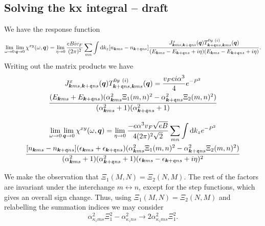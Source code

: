 \subsection{Solving the kx integral -- draft}
We have the response function
\[
  \lim_{\omega \to 0} \lim_{\bm{q} \to 0} \chi^{xy}(\omega, \bm{q}) = \lim_{\eta \to 0}
  \frac{e B i v_F}{(2 \pi)^2}
  \sum\limits_{mn}^{} \int \mathrm{d}k_z [n_{\bm{k} m s} - n_{\bm{k}+\mathfrak{q} n s}]
  \frac{
    J^x_{\bm{k} m s, \bm{k} + \mathfrak{q} ns} (\bm{q}) T^{0y~(i)}_{\bm{k}+\mathfrak{q} n s, \bm{k}ms}(\bm{q})
  }{
    (E_{\bm{k} m s} - E_{\bm{k}+\mathfrak{q} ns} + i \eta)(E_{\bm{k}ms}-E_{\bm{k}+\mathfrak{q} ns} + i \eta)
  }.
\]
Writing out the matrix products we have
\begin{multline}
  J^x_{\bm{k} m s, \bm{k} + \mathfrak{q} ns} (\bm{q}) T^{0y~(i)}_{\bm{k}+\mathfrak{q} n s, \bm{k}ms}(\bm{q})
  =
  \frac{v_F e i \alpha^{3}}{4}
  e^{-P^2}\\
  \frac{
    (E_{\bm{k} m s} + E_{\bm{k}+\mathfrak{q} n s})
    (\alpha_{\bm{k} m s}^2 \Xi_1(m,n)^2 - \alpha_{\bm{k} + \mathfrak{q} n s}^2 \Xi_2(m,n)^2)
  }{
    (\alpha_{\bm{k} m s}^2 + 1)(\alpha_{\bm{k}+\mathfrak{q} n s}^2 + 1)
  }
  \label{eq:91}
\end{multline}

\begin{multline}
  \label{eq:92}
  \lim_{\omega \to 0} \lim_{\bm{q} \to 0} \chi^{xy}(\omega, \bm{q}) = \lim_{\eta \to 0}
  \frac{- e \alpha^3 v_F \sqrt{e B} }{4 (2 \pi)^2 \sqrt{2} }
  \sum\limits_{mn}^{}
  \int \mathrm{d}k_z
  e^{-P^2}\\
  \frac{
    [n_{\bm{k} m s} - n_{\bm{k}+\mathfrak{q} n s}]
    (\epsilon_{\bm{k} m s} + \epsilon_{\bm{k}+\mathfrak{q} n s})
    (\alpha_{\bm{k} m s}^2 \Xi_1(m,n)^2 - \alpha_{\bm{k} + \mathfrak{q} n s}^2 \Xi_2(m,n)^2)
  }{
    (\alpha_{\bm{k} m s}^2 + 1)(\alpha_{\bm{k}+\mathfrak{q} n s}^2 + 1)
    (\epsilon_{\bm{k} m s} - \epsilon_{\bm{k}+\mathfrak{q} ns} + i \eta)^2
  }
\end{multline}

We make the observation that \( \Xi _1(M, N) = \Xi _2(N, M) \).
The rest of the factors are invariant under the interchange \( m \leftrightarrow n \), except for the step functions, which gives an overall sign change.
Thus, using \( \Xi _1(M, N) = \Xi _2(N, M) \) and relabelling the summation indices we may consider
\[
  \alpha_{\kappa_z m s}^2 \Xi_1^2 - \alpha_{\kappa_z n s}^2 \to 2 \alpha_{\kappa_z m s}^2 \Xi_1^2.
\]

